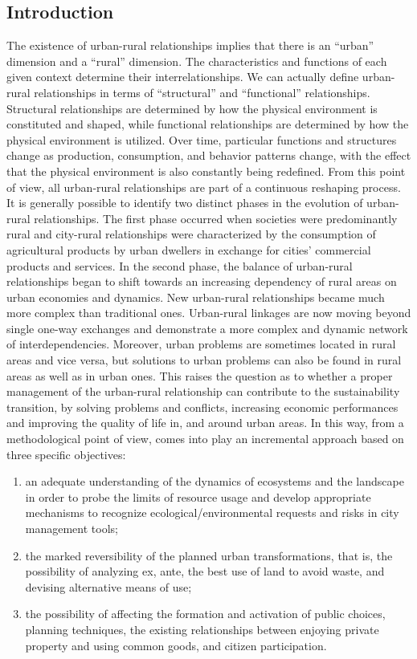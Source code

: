 \documentclass[10pt,a4paper]{article}
\begin{document}
\begin{multicols}{2}

\section{Introduction}
\noindent The existence of urban-rural relationships implies that there is an ``urban'' dimension and a ``rural'' dimension. The characteristics and functions of each given context determine their interrelationships. We can actually define urban-rural relationships in terms of ``structural'' and ``functional'' relationships. Structural relationships are determined by how the physical environment is constituted and shaped, while functional relationships are determined by how the physical environment is utilized. Over time, particular functions and structures change as production, consumption, and behavior patterns change, with the effect that the physical environment is also constantly being redefined. From this point of view, all urban-rural relationships are part of a continuous reshaping process. It is generally possible to identify two distinct phases in the evolution of urban-rural relationships. The first phase occurred when societies were predominantly rural and city-rural relationships were characterized by the consumption of agricultural products by urban dwellers in exchange for cities' commercial products and services. In the second phase, the balance of urban-rural relationships began to shift towards an increasing dependency of rural areas on urban economies and dynamics. New urban-rural relationships became much more complex than traditional ones. Urban-rural linkages are now moving beyond single one-way exchanges and demonstrate a more complex and dynamic network of interdependencies. Moreover, urban problems are sometimes located in rural areas and vice versa, but solutions to urban problems can also be found in rural areas as well as in urban ones. This raises the question as to whether a proper management of the urban-rural relationship can contribute to the sustainability transition, by solving problems and conflicts, increasing economic performances and improving the quality of life in, and around urban areas. 
In this way, from a methodological point of view, comes into play an incremental approach based on three specific objectives:

\begin{enumerate}
	\item an adequate understanding of the dynamics of ecosystems and the landscape in order to probe the limits of resource usage and develop appropriate mechanisms to recognize ecological/environmental requests and risks in city management tools;
	\item the marked reversibility of the planned urban transformations, that is, the possibility of analyzing ex, ante, the best use of land to avoid waste, and devising alternative means of use;
	\item the possibility of affecting the formation and activation of public choices, planning techniques, the existing relationships between enjoying private property and using common goods, and citizen participation.
\end{enumerate}


\end{multicols}
\end{document}
